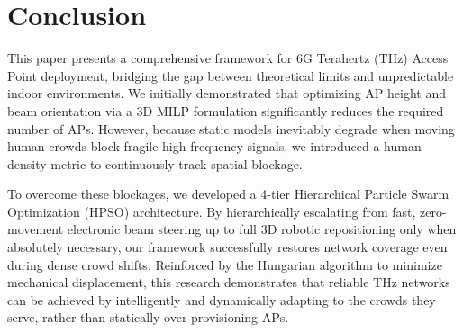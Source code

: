 \documentclass[conference]{IEEEtran}
\begin{document}
	
	\section{Conclusion}
	
	This paper presents a comprehensive framework for 6G Terahertz (THz) Access Point deployment, bridging the gap between theoretical limits and unpredictable indoor environments. We initially demonstrated that optimizing AP height and beam orientation via a 3D MILP formulation significantly reduces the required number of APs. However, because static models inevitably degrade when moving human crowds block fragile high-frequency signals, we introduced a human density metric to continuously track spatial blockage. 
	
	To overcome these blockages, we developed a 4-tier Hierarchical Particle Swarm Optimization (HPSO) architecture. By hierarchically escalating from fast, zero-movement electronic beam steering up to full 3D robotic repositioning only when absolutely necessary, our framework successfully restores network coverage even during dense crowd shifts. Reinforced by the Hungarian algorithm to minimize mechanical displacement, this research demonstrates that reliable THz networks can be achieved by intelligently and dynamically adapting to the crowds they serve, rather than statically over-provisioning APs.
	
\end{document}
